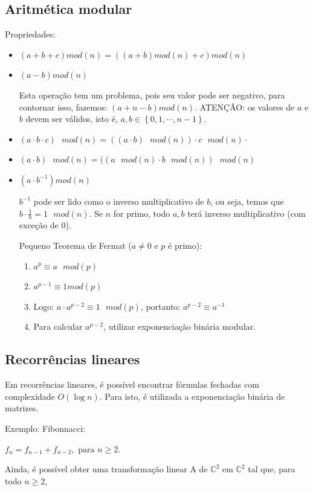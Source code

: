 \subsection{Aritmética modular}
 Propriedades:
 \begin{itemize}
     \item $(a + b + c) mod(n) = ((a + b) mod(n) + c) mod(n)$
     \item $(a - b) mod(n)$
        \par Esta operação tem um problema, pois seu valor pode ser negativo, para contornar isso, fazemos: $(a + n - b) mod(n)$. ATENÇÃO: os valores de $a$ e $b$ devem ser válidos, isto é, $a,b\in \left\{0, 1, \cdots, n-1\right\}$.
    \item $(a \cdot b \cdot c) \mbox{ }mod(n) = ((a\cdot b) \mbox{ }mod(n)) \cdot c \mbox{ }mod(n) \cdot$
    \item $(a \cdot b) \mbox{ }mod(n) = ((a\mbox{ }mod(n) \cdot b\mbox{ }mod(n)) \mbox{ }mod(n)$
    \item $(a\cdot b^{-1}) mod(n)$
        \par $b^{-1}$ pode ser lido como o inverso multiplicativo de $b$, ou seja, temos que  \\$b\cdot \frac{1}{b} = 1 \mbox{ }mod(n)$. Se $n$ for primo, todo $a,b$ terá inverso multiplicativo (com exceção de 0).
        \par Pequeno Teorema de Fermat ($a \neq 0$ e $p$ é primo):
        \begin{enumerate}
            \item
            $a^p \equiv a\mbox{ } mod (p)$
            \item $a^{p-1} \equiv 1 mod (p)$
            \item Logo: $a\cdot a^{p-2} \equiv 1 \mbox{ } mod(p)$, portanto: $a^{p-2} \equiv a^{-1}$
            \item Para calcular $a^{p-2}$, utilizar exponenciação binária modular.
        \end{enumerate}
 \end{itemize}

 \subsection{Recorrências lineares}
 \par Em recorrências lineares, é possível encontrar fórmulas fechadas com complexidade $O(\log n)$. Para isto, é utilizada a exponenciação binária de matrizes.
 \par Exemplo: Fibonnacci:
 \begin{center}
     $f_n = f_{n-1} + f_{n-2}, \mbox{ para } n\geq2$.
 \end{center}
 \par Ainda, é possível obter uma transformação linear A de $\mathbb{C}^2$ em $\mathbb{C}^2$ tal que, para todo $n\geq2$,

